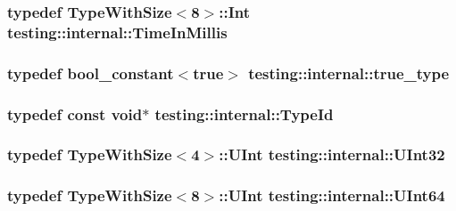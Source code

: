 \subsubsection[{Time\+In\+Millis}]{\setlength{\rightskip}{0pt plus 5cm}typedef {\bf Type\+With\+Size}$<$8$>$\+::Int {\bf testing\+::internal\+::\+Time\+In\+Millis}}\label{namespacetesting_1_1internal_a66a845df404b38fe85c5e14a069f255a}
\hypertarget{namespacetesting_1_1internal_a62f917c3424d8841de9b49b5ec28edb4}{}
\subsubsection[{true\+\_\+type}]{\setlength{\rightskip}{0pt plus 5cm}typedef {\bf bool\+\_\+constant}$<$true$>$ {\bf testing\+::internal\+::true\+\_\+type}}\label{namespacetesting_1_1internal_a62f917c3424d8841de9b49b5ec28edb4}
\hypertarget{namespacetesting_1_1internal_ab1114197d3c657d8b7f8e0c5caa12d00}{}
\subsubsection[{Type\+Id}]{\setlength{\rightskip}{0pt plus 5cm}typedef const void$\ast$ {\bf testing\+::internal\+::\+Type\+Id}}\label{namespacetesting_1_1internal_ab1114197d3c657d8b7f8e0c5caa12d00}
\hypertarget{namespacetesting_1_1internal_a40d4fffcd2bf56f18b1c380615aa85e3}{}
\subsubsection[{U\+Int32}]{\setlength{\rightskip}{0pt plus 5cm}typedef {\bf Type\+With\+Size}$<$4$>$\+::U\+Int {\bf testing\+::internal\+::\+U\+Int32}}\label{namespacetesting_1_1internal_a40d4fffcd2bf56f18b1c380615aa85e3}
\hypertarget{namespacetesting_1_1internal_aa6a1ac454e6d7e550fa4925c62c35caa}{}
\subsubsection[{U\+Int64}]{\setlength{\rightskip}{0pt plus 5cm}typedef {\bf Type\+With\+Size}$<$8$>$\+::U\+Int {\bf testing\+::internal\+::\+U\+Int64}}\label{namespacetesting_1_1internal_aa6a1ac454e6d7e550fa4925c62c35caa}
\hypertarget{namespacetesting_1_1internal_a3f543179329c353aee1d7b54a9a8e335}{}
